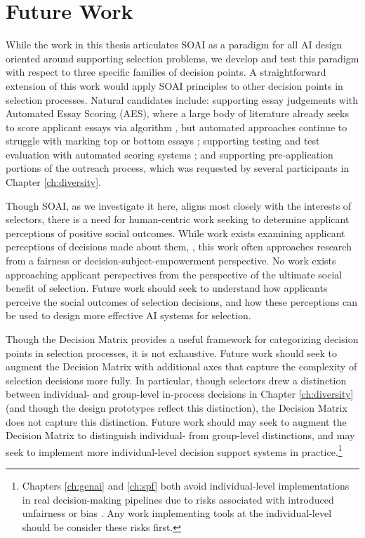 \section{Future Work}
While the work in this thesis articulates SOAI as a paradigm for all AI design oriented around supporting selection problems, we develop and test this paradigm with respect to three specific families of decision points. A straightforward extension of this work would apply SOAI principles to other decision points in selection processes. Natural candidates include: supporting essay judgements with Automated Essay Scoring (AES), where a large body of literature already seeks to score applicant essays via algorithm \cite{cozma_automated_2018,ramesh_automated_2022,wang_use_2022,elijahthesis}, but automated approaches continue to struggle with marking top or bottom essays \cite{elijahthesis}; supporting testing and test evaluation with automated scoring systems \cite{organisciak_beyond_2023,condon2014international}; and supporting pre-application portions of the outreach process, which was requested by several participants in Chapter \ref{ch:diversity}.

Though SOAI, as we investigate it here, aligns most closely with the interests of selectors, there is a need for human-centric work seeking to determine applicant perceptions of positive social outcomes. While work exists examining applicant perceptions of decisions made about them, \cite{pandey_applicants_2022,horodyski_applicants_2023}, this work often approaches research from a fairness or decision-subject-empowerment perspective. No work exists approaching applicant perspectives from the perspective of the ultimate social benefit of selection. Future work should seek to understand how applicants perceive the social outcomes of selection decisions, and how these perceptions can be used to design more effective AI systems for selection.

Though the Decision Matrix provides a useful framework for categorizing decision points in selection processes, it is not exhaustive. Future work should seek to augment the Decision Matrix with additional axes that capture the complexity of selection decisions more fully. In particular, though selectors drew a distinction between individual- and group-level in-process decisions in Chapter \ref{ch:diversity} (and though the design prototypes reflect this distinction), the Decision Matrix does not capture this distinction. Future work should may seek to augment the Decision Matrix to distinguish individual- from group-level distinctions, and may seek to implement more individual-level decision support systems in practice.\footnote{Chapters \ref{ch:genai} and \ref{ch:spf} both avoid individual-level implementations in real decision-making pipelines due to risks associated with introduced unfairness or bias \cite{hartigan_fairness_1989,barocas2023fairness,pmlr-v80-kearns18a,Bastounis_Campodonico_vanderSchaar_Adcock_Hansen_2024,liang_gpt_2023}. Any work implementing tools at the individual-level should be consider these risks first.}

